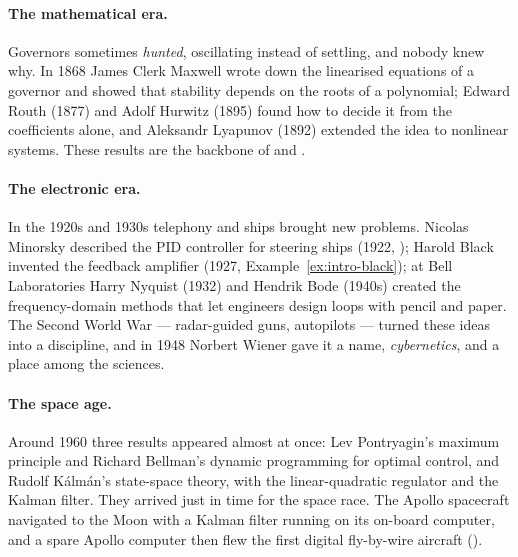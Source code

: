 \paragraph{The mathematical era.} Governors sometimes \emph{hunted}, oscillating instead of settling, and nobody knew why. In 1868 James Clerk Maxwell wrote down the linearised equations of a governor and showed that stability depends on the roots of a polynomial; Edward Routh (1877) and Adolf Hurwitz (1895) found how to decide it from the coefficients alone, and Aleksandr Lyapunov (1892) extended the idea to nonlinear systems. These results are the backbone of  and .

\paragraph{The electronic era.} In the 1920s and 1930s telephony and ships brought new problems. Nicolas Minorsky described the PID controller for steering ships (1922, ); Harold Black invented the feedback amplifier (1927, Example~\ref{ex:intro-black}); at Bell Laboratories Harry Nyquist (1932) and Hendrik Bode (1940s) created the frequency-domain methods that let engineers design loops with pencil and paper. The Second World War — radar-guided guns, autopilots — turned these ideas into a discipline, and in 1948 Norbert Wiener gave it a name, \emph{cybernetics}, and a place among the sciences.

\paragraph{The space age.} Around 1960 three results appeared almost at once: Lev Pontryagin's maximum principle and Richard Bellman's dynamic programming for optimal control, and Rudolf Kálmán's state-space theory, with the linear-quadratic regulator and the Kalman filter. They arrived just in time for the space race. The Apollo spacecraft navigated to the Moon with a Kalman filter running on its on-board computer, and a spare Apollo computer then flew the first digital fly-by-wire aircraft ().

